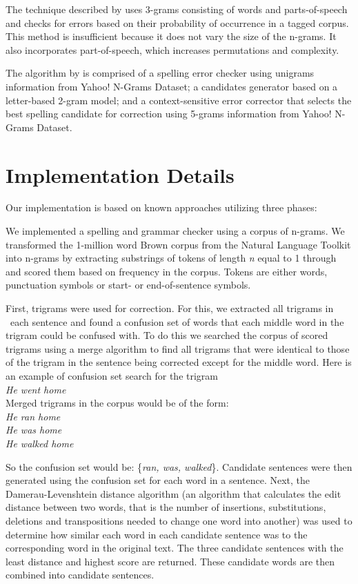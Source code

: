 \documentclass[twocolumn]{article}
\newcommand{\tab}{\hspace*{2em}}
\begin{document}
The technique described by \cite{Fossati07} uses 3-grams consisting of words and
parts-of-speech and checks for errors based on their probability of occurrence
in a tagged corpus. This method is insufficient because it does not vary the
size of the n-grams. It also incorporates part-of-speech, which increases
permutations and complexity.

The algorithm by \cite{Bassil12} is comprised of a spelling error checker using
unigrams information from Yahoo! N-Grams Dataset; a candidates generator based
on a letter-based 2-gram model; and a context-sensitive error corrector that
selects the best spelling candidate for correction using 5-grams information
from Yahoo! N-Grams Dataset.

\section{Implementation Details}
Our implementation is based on known approaches utilizing three phases:

We implemented a spelling and grammar checker using a corpus of n-grams. We transformed the 1-million word Brown corpus from the Natural Language Toolkit into n-grams by extracting substrings of tokens of length \textit{n} equal to 1 through and scored them based on frequency in the corpus. Tokens are either words, punctuation symbols or start- or end-of-sentence symbols.

First, trigrams were used for correction. For this, we extracted all trigrams in
 each sentence and found a confusion set of words that each middle word in the
trigram could be confused with. To do this we searched the corpus of scored
trigrams using a merge algorithm to find all trigrams that were identical to
those of the trigram in the sentence being corrected except for the middle word.
Here is an example of confusion set search for the trigram
\\
\newline
\tab\tab\textit{He went home}
\\\newline
Merged trigrams in the corpus would be of the form:
\\\newline
\tab\tab\textit{He ran home} \\
\tab\tab\textit{He was home} \\
\tab\tab\textit{He walked home}
\newline

So the confusion set would be: \{\textit{ran, was, walked}\}. Candidate sentences
were then generated using the confusion set for each word in a sentence. Next,
the Damerau-Levenshtein distance \cite{damerau64,levenshtein66} algorithm (an 
algorithm that calculates the edit distance between two words, that is the number 
of insertions, substitutions, deletions and transpositions needed to change one 
word into another) was used to determine how similar each word in each candidate sentence was to the
corresponding word in the original text. The three candidate sentences with the
least distance and highest score are returned. These candidate words are then
combined into candidate sentences.
\end{document}
